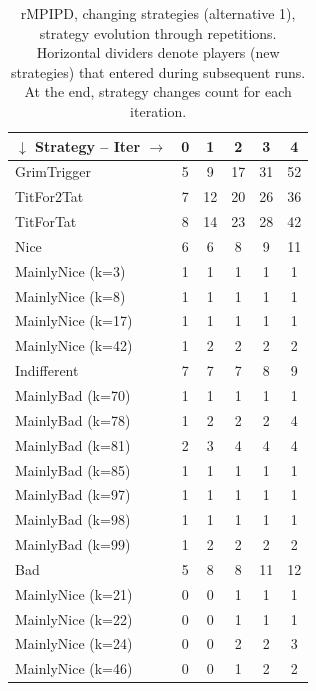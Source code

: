 \documentclass[journal,10pt,twoside]{IEEEtran}
\begin{document}
\begin{table}[ht]
	\caption{rMPIPD, changing strategies (alternative 1), strategy evolution through repetitions.\\
	Horizontal dividers denote players (new strategies) that entered during subsequent runs.\\
	At the end, strategy changes count for each iteration.}
	\label{tab:cripdmp}
	\centering
	\begin{tabular}{l|ccccc} \toprule
		$\downarrow$ Strategy -- Iter $\rightarrow$ & 0 & 1 & 2 & 3 & 4 \\ \midrule
		GrimTrigger       &   5 &   9 &   17 &   31 &   52 \\
		TitFor2Tat        &   7 &  12 &   20 &   26 &   36 \\
		TitForTat         &   8 &  14 &   23 &   28 &   42 \\
		Nice              &   6 &   6 &    8 &    9 &   11 \\
		MainlyNice (k=3)  &   1 &   1 &    1 &    1 &    1 \\
		MainlyNice (k=8)  &   1 &   1 &    1 &    1 &    1 \\
		MainlyNice (k=17) &   1 &   1 &    1 &    1 &    1 \\
		MainlyNice (k=42) &   1 &   2 &    2 &    2 &    2 \\
		Indifferent       &   7 &   7 &    7 &    8 &    9 \\
		MainlyBad (k=70)  &   1 &   1 &    1 &    1 &    1 \\
		MainlyBad (k=78)  &   1 &   2 &    2 &    2 &    4 \\
		MainlyBad (k=81)  &   2 &   3 &    4 &    4 &    4 \\
		MainlyBad (k=85)  &   1 &   1 &    1 &    1 &    1 \\
		MainlyBad (k=97)  &   1 &   1 &    1 &    1 &    1 \\
		MainlyBad (k=98)  &   1 &   1 &    1 &    1 &    1 \\
		MainlyBad (k=99)  &   1 &   2 &    2 &    2 &    2 \\
		Bad               &   5 &   8 &    8 &   11 &   12 \\ \midrule
		MainlyNice (k=21) &   0 &   0 &    1 &    1 &    1 \\
		MainlyNice (k=22) &   0 &   0 &    1 &    1 &    1 \\
		MainlyNice (k=24) &   0 &   0 &    2 &    2 &    3 \\
		MainlyNice (k=46) &   0 &   0 &    1 &    2 &    2 \\

\end{tabular}
\end{table}
\end{document}
